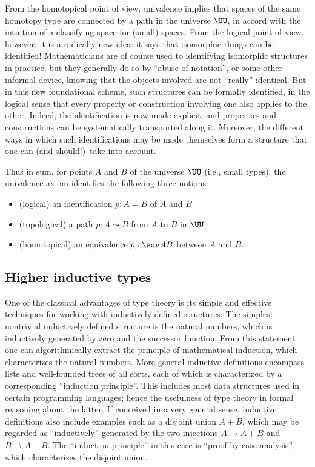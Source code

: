 From the homotopical point of view, univalence implies that spaces of the same homotopy type are connected by a path in the universe $\UU$, in accord with the intuition of a classifying space for (small) spaces.
From the logical point of view, however, it is a radically new idea: it says that isomorphic things can be identified!  Mathematicians are of course used to identifying isomorphic structures in practice, but they generally do so by ``abuse of notation'', or some other informal device, knowing that the objects involved are not ``really'' identical.  But in this new foundational scheme, such structures can be formally identified, in the logical sense that every property or construction involving one also applies to the other. Indeed, the identification is now made explicit, and properties and constructions can be systematically transported along it.  Moreover, the different ways in which such identifications may be made themselves form a structure that one can (and should!)\ take into account.

Thus in sum, for points $A$ and $B$ of the universe $\UU$ (i.e., small types), the univalence axiom identifies the following three notions:
\begin{itemize}
\item (logical) an identification $p:A=B$ of $A$ and $B$
\item (topological) a path $p:A \leadsto B$ from $A$ to $B$ in $\UU$
\item (homotopical) an equivalence $p:\eqv A B$ between $A$ and $B$.
\end{itemize}

\subsection*{Higher inductive types}%

One of the classical advantages of type theory is its simple and effective techniques for working with inductively defined structures.
The simplest nontrivial inductively defined structure is the natural numbers, which is inductively generated by zero and the successor function.
From this statement one can algorithmically extract the principle of mathematical induction, which characterizes the natural numbers.
More general inductive definitions encompass lists and well-founded trees of all sorts, each of which is characterized by a corresponding ``induction principle''.
This includes most data structures used in certain programming languages; hence the usefulness of type theory in formal reasoning about the latter.
If conceived in a very general sense, inductive definitions also include examples such as a disjoint union $A+B$, which may be regarded as ``inductively'' generated by the two injections $A\to A+B$ and $B\to A+B$.
The ``induction principle'' in this case is ``proof by case analysis'', which characterizes the disjoint union.

